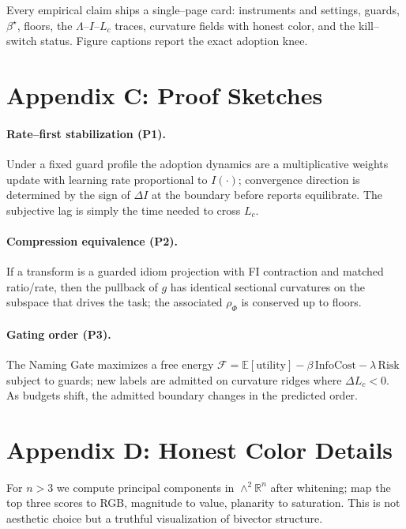 \documentclass[11pt]{article}
\newcommand{\1}{\mathbf{1}}
\begin{document}
Every empirical claim ships a single--page card: instruments and settings, guards, $\beta^\star$, floors, the $\Lambda$--$I$--$L_c$ traces, curvature fields with honest color, and the kill--switch status. Figure captions report the exact adoption knee.

\section{Appendix C: Proof Sketches}
\label{app:proofs}

\paragraph{Rate--first stabilization (P1).} Under a fixed guard profile the adoption dynamics are a multiplicative weights update with learning rate proportional to $I(\cdot)$; convergence direction is determined by the sign of $\Delta I$ at the boundary before reports equilibrate. The subjective lag is simply the time needed to cross $L_c$.

\paragraph{Compression equivalence (P2).} If a transform is a guarded idiom projection with FI contraction and matched ratio/rate, then the pullback of $g$ has identical sectional curvatures on the subspace that drives the task; the associated $\rho_{\Phi}$ is conserved up to floors.

\paragraph{Gating order (P3).} The Naming Gate maximizes a free energy $\mathcal{F}=\mathbb{E}[\mathrm{utility}]-\beta\,\mathrm{InfoCost}-\lambda\,\mathrm{Risk}$ subject to guards; new labels are admitted on curvature ridges where $\Delta L_c<0$. As budgets shift, the admitted boundary changes in the predicted order.

\section{Appendix D: Honest Color Details}
\label{app:color}

For $n>3$ we compute principal components in $\wedge^2\mathbb{R}^n$ after whitening; map the top three scores to RGB, magnitude to value, planarity to saturation. This is not aesthetic choice but a truthful visualization of bivector structure.
\end{document}
